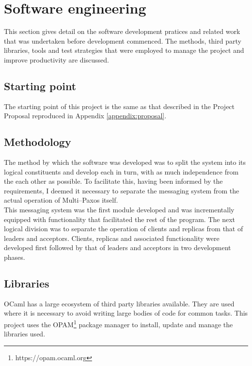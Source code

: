 

\section{Software engineering}

This section gives detail on the software development pratices and related work that was undertaken before development commenced. The methods, third party libraries, tools and test strategies that were employed to manage the project and improve productivity are discussed.

\subsection{Starting point}

The starting point of this project is the same as that described in the Project Proposal reproduced in Appendix \ref{appendix:proposal}.

\subsection{Methodology}

The method by which the software was developed was to split the system into its logical constituents and develop each in turn, with as much independence from the each other as possible. To facilitate this, having been informed by the requirements, I deemed it necessary to separate the messaging system from the actual operation of Multi--Paxos itself. \\

This messaging system was the first module developed and was incrementally equipped with functionality that facilitated the rest of the program. The next logical division was to separate the operation of clients and replicas from that of leaders and acceptors. Clients, replicas and associated functionality were developed first followed by that of leaders and acceptors in two development phases. \\

\subsection{Libraries}

OCaml has a large ecosystem of third party libraries available. They are used where it is necessary to avoid writing large bodies of code for common tasks. This project uses the OPAM\footnote{https://opam.ocaml.org} package manager to install, update and manage the libraries used. \\ 

